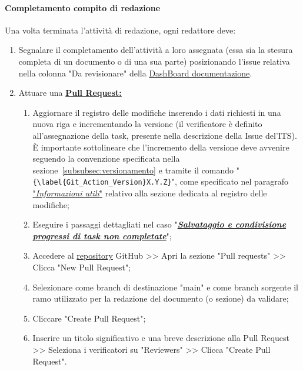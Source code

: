 \vspace{0.3cm}

\paragraph*{\textbf{Completamento compito di redazione}}
Una volta terminata l'attività di redazione, ogni redattore deve:
\begin{enumerate}
    \item Segnalare il completamento dell'attività a loro assegnata (essa sia la stesura completa di un documento o di una sua parte) posizionando l'issue relativa nella colonna "Da revisionare" della \href{https://github.com/orgs/ByteOps-swe/projects/1/views/1}{DashBoard documentazione}.
    \item Attuare una \hyperlink{par:creazionePR}{\textbf{Pull Request:}}
          \begin{enumerate}
              \item Aggiornare il registro delle modifiche inserendo i dati richiesti in una nuova riga e incrementando la versione (il verificatore è definito all'assegnazione della task, presente nella descrizione della Issue del'ITS).
              È importante sottolineare che l'incremento della versione deve avvenire seguendo la convenzione specificata nella sezione~\ref{subsubsec:versionamento} e tramite il comando "\verb|{\label{Git_Action_Version}X.Y.Z}|", come specificato nel paragrafo \hyperlink{par:infoUtiliRegistroMod}{"\textit{Informazioni utili}"} relativo alla sezione dedicata al registro delle modifiche;
              \item Eseguire i passaggi dettagliati nel caso "\hyperlink{par:salvataggioecondivisioneprogressitasknoncompletate}{\textit{\textbf{Salvataggio e condivisione progressi di task non completate}}}";
              \item Accedere al \href{https://github.com/ByteOps-swe/Sorgente-documenti.git}{repository} GitHub >> Apri la sezione "Pull requests" >> Clicca "New Pull Request";
              \item Selezionare come branch di destinazione "main" e come branch sorgente il ramo utilizzato per la redazione del documento (o sezione) da validare;
              \item Cliccare "Create Pull Request";
              \item Inserire un titolo significativo e una breve descrizione alla Pull Request >> Seleziona i verificatori su "Reviewers" >> Clicca "Create Pull Request".
          \end{enumerate}
\end{enumerate}


